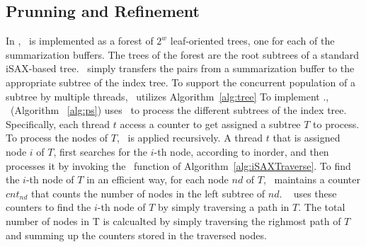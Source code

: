 \subsection{Prunning and Refinement}

In \Fresh, \PS\ is implemented as a forest of $2^w$ leaf-oriented trees,
one for each of the summarization buffers. 
The trees of the forest are the root subtrees of a standard iSAX-based tree.
\TreePopulation\ simply transfers the pairs from a summarization buffer
to the appropriate subtree of the index tree. 
To support the concurrent population of a subtree by multiple threads, 
\Fresh\ utilizes Algorithm~\ref{alg:tree} 
%
To implement \PS.\Traverse, \Fresh\ (Algorithm ~\ref{alg:ps}) uses \Refresh\ to process 
the different subtrees of the index tree. Specifically, 
each thread $t$ access a counter to get assigned a subtree $T$ to process.
To process the nodes of $T$, \Refresh\ is applied recursively. %
A thread $t$ that is assigned node $i$ of $T$,
first searches for the $i$-th node, according to inorder,
and then processes it by invoking the \Prunning\ function %
of Algorithm~\ref{alg:iSAXTraverse}. 
%
To find the $i$-th node of $T$ in an efficient way, 
for each node $nd$ of $T$, \Fresh\ maintains a counter
$\mathit{cnt_{nd}}$ that counts the number of nodes in the left subtree
of $\mathit{nd}$. \Fresh\ %
uses these counters to find the $i$-th node of $T$ by simply traversing a path in $T$.
The total number of nodes in T is calcualted by simply traversing the righmost path of
$T$ and summing up the counters stored in the traversed nodes.

